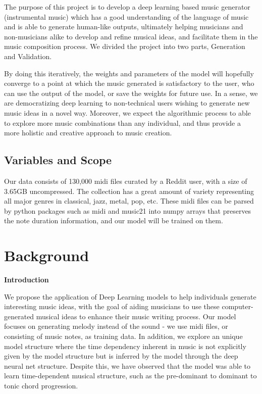 \documentclass[12pt,oneside]{chicagocapstone}
\begin{document}
The purpose of this project is to develop a deep learning based music generator (instrumental music) which has a good understanding of the language of music and is able to generate human-like outputs, ultimately helping musicians and non-musicians alike to develop and refine musical ideas, and facilitate them in the music composition process. We divided the project into two parts, Generation and Validation.

By doing this iteratively, the weights and parameters of the model will hopefully converge to a point at which the music generated is satisfactory to the user, who can use the output of the model, or save the weights for future use. In a sense, we are democratizing deep learning to non-technical users wishing to generate new music ideas in a novel way. Moreover, we expect the algorithmic process to able to explore more music combinations than any individual, and thus provide a more holistic and creative approach to music creation.

\hypertarget{variables-and-scope}{%
\section*{Variables and Scope}\label{variables-and-scope}}

Our data consists of 130,000 midi files curated by a Reddit user, with a size of 3.65GB uncompressed. The collection has a great amount of variety representing all major genres in classical, jazz, metal, pop, etc. These midi files can be parsed by python packages such as midi and music21 into numpy arrays that preserves the note duration information, and our model will be trained on them.

\hypertarget{background}{%
\chapter*{Background}\label{background}}

\textbf{Introduction}

We propose the application of Deep Learning models to help individuals generate interesting music ideas, with the goal of aiding musicians to use these computer-generated musical ideas to enhance their music writing process. Our model focuses on generating melody instead of the sound - we use midi files, or consisting of music notes, as training data. In addition, we explore an unique model structure where the time dependency inherent in music is not explicitly given by the model structure but is inferred by the model through the deep neural net structure. Despite this, we have observed that the model was able to learn time-dependent musical structure, such as the pre-dominant to dominant to tonic chord progression.
\end{document}
